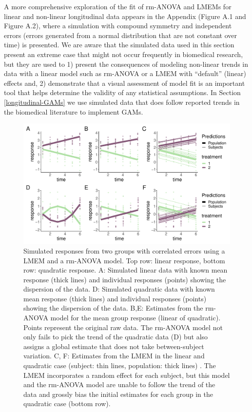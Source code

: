 \documentclass[
]{article}
\begin{document}
A more comprehensive exploration of the fit of rm-ANOVA and LMEMs for linear and non-linear longitudinal data appears in the Appendix (Figure A.1 and Figure A.2), where a simulation with compound symmetry and independent errors (errors generated from a normal distribution that are not constant over time) is presented. We are aware that the simulated data used in this section present an extreme case that might not occur frequently in biomedical research, but they are used to 1) present the consequences of modeling non-linear trends in data with a linear model such as rm-ANOVA or a LMEM with ``default'' (linear) effects and, 2) demonstrate that a visual assessment of model fit is an important tool that helps determine the validity of any statistical assumptions. In Section \ref{longitudinal-GAMs} we use simulated data that does follow reported trends in the biomedical literature to implement GAMs.



\begin{figure}

{\centering \includegraphics[width=1\linewidth]{Full_document_SIM_No_Appendix_files/figure-latex/l-q-response-1} 

}

\caption{Simulated responses from two groups with correlated errors using a LMEM and a rm-ANOVA model. Top row: linear response, bottom row: quadratic response. A: Simulated linear data with known mean response (thick lines) and individual responses (points) showing the dispersion of the data. D: Simulated quadratic data with known mean response (thick lines) and individual responses (points) showing the dispersion of the data. B,E: Estimates from the rm-ANOVA model for the mean group response (linear of quadratic). Points represent the original raw data. The rm-ANOVA model not only fails to pick the trend of the quadratic data (D) but also assigns a global estimate that does not take between-subject variation. C, F: Estimates from the LMEM in the linear and quadratic case (subject: thin lines, population: thick lines) . The LMEM incorporates a random effect for each subject, but this model and the rm-ANOVA model are unable to follow the trend of the data and grossly bias the initial estimates for each group in the quadratic case (bottom row).}\label{fig:l-q-response}
\end{figure}
\end{document}
